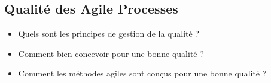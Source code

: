 \subsection{Qualité des Agile Processes}


\begin{itemize}
	\item Quels sont les principes de gestion de la qualité ?
	\item Comment bien concevoir pour une bonne qualité ?
	\item Comment les méthodes agiles sont conçus pour une bonne qualité ?
\end{itemize}